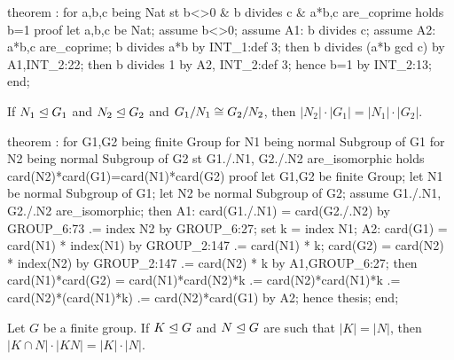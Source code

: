 \nwenddocs{}\endmoddef\nwstartdeflinemarkup{}\nwenddeflinemarkup
theorem :
  for a,b,c being Nat
  st b<>0 & b divides c & a*b,c are_coprime
  holds b=1
proof
  let a,b,c be Nat;
  assume b<>0;
  assume A1: b divides c;
  assume A2: a*b,c are_coprime;
  b divides a*b by INT_1:def 3;
  then b divides (a*b gcd c) by A1,INT_2:22;
  then b divides 1 by A2, INT_2:def 3;
  hence b=1 by INT_2:13;
end;
\eatline
{}\nwendcode{}\nwdocspar
\begin{theorem}
If $N_{1}\trianglelefteq G_{1}$ and $N_{2}\trianglelefteq G_{2}$ and
$G_{1}/N_{1}\cong G_{2}/N_{2}$, then $|N_{2}|\cdot|G_{1}|=|N_{1}|\cdot|G_{2}|$.
\end{theorem}

\nwenddocs{}\endmoddef\nwstartdeflinemarkup{}\nwenddeflinemarkup
theorem :
  for G1,G2 being finite Group
  for N1 being normal Subgroup of G1
  for N2 being normal Subgroup of G2
  st G1./.N1, G2./.N2 are_isomorphic
  holds card(N2)*card(G1)=card(N1)*card(G2)
proof
  let G1,G2 be finite Group;
  let N1 be normal Subgroup of G1;
  let N2 be normal Subgroup of G2;
  assume G1./.N1, G2./.N2 are_isomorphic;
  then A1: card(G1./.N1) = card(G2./.N2) by GROUP_6:73
                        .= index N2 by GROUP_6:27;
  set k = index N1;
  A2: card(G1) = card(N1) * index(N1) by GROUP_2:147
              .= card(N1) * k;
  card(G2) = card(N2) * index(N2) by GROUP_2:147
          .= card(N2) * k by A1,GROUP_6:27;
  then card(N1)*card(G2) = card(N1)*card(N2)*k
                        .= card(N2)*card(N1)*k
                        .= card(N2)*(card(N1)*k)
                        .= card(N2)*card(G1) by A2;
  hence thesis;
end;
\eatline
{}\nwendcode{}\nwdocspar
\begin{theorem}
Let $G$ be a finite group.
If $K\trianglelefteq G$ and $N\trianglelefteq G$ are such that $|K|=|N|$,
then $|K\cap N|\cdot|KN|=|K|\cdot|N|$.
\end{theorem}

